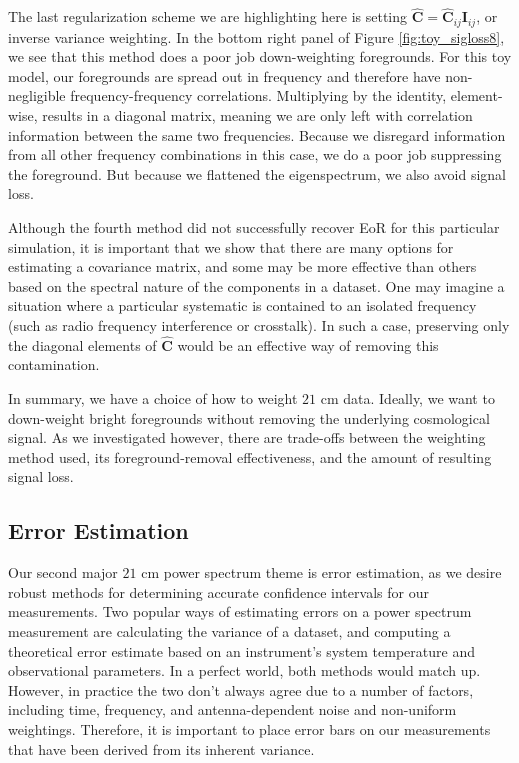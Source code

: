 \documentclass[preprint2,numberedappendix,tighten]{aastex6}  %
\begin{document}
The last regularization scheme we are highlighting here is setting $\hat{\textbf{C}} = \hat{\textbf{C}}_{ij}\textbf{I}_{ij}$, or inverse variance weighting. In the bottom right panel of Figure \ref{fig:toy_sigloss8}, we see that this method does a poor job down-weighting foregrounds. For this toy model, our foregrounds are spread out in frequency and therefore have non-negligible frequency-frequency correlations. Multiplying by the identity, element-wise, results in a diagonal matrix, meaning we are only left with correlation information between the same two frequencies. Because we disregard information from all other frequency combinations in this case, we do a poor job suppressing the foreground. But because we flattened the eigenspectrum, we also avoid signal loss. 

Although the fourth method did not successfully recover EoR for this particular simulation, it is important that we show that there are many options for estimating a covariance matrix, and some may be more effective than others based on the spectral nature of the components in a dataset. One may imagine a situation where a particular systematic is contained to an isolated frequency (such as radio frequency interference or crosstalk). In such a case, preserving only the diagonal elements of $\hat{\textbf{C}}$ would be an effective way of removing this contamination. 

In summary, we have a choice of how to weight $21$ cm data. Ideally, we want to down-weight bright foregrounds without removing the underlying cosmological signal. As we investigated however, there are trade-offs between the weighting method used, its foreground-removal effectiveness, and the amount of resulting signal loss. 


\subsection{Error Estimation}
\label{sec:ErrorOverview}

Our second major $21$ cm power spectrum theme is error estimation, as we desire robust methods for determining accurate confidence intervals for our measurements. Two popular ways of estimating errors on a power spectrum measurement are calculating the variance of a dataset, and computing a theoretical error estimate based on an instrument's system temperature and observational parameters. In a perfect world, both methods would match up. However, in practice the two don't always agree due to a number of factors, including time, frequency, and antenna-dependent noise and non-uniform weightings. Therefore, it is important to place error bars on our measurements that have been derived from its inherent variance.
\end{document}
